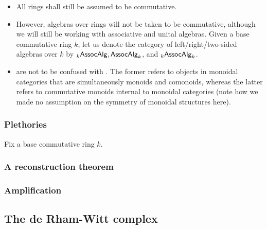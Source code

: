             \begin{convention} \label{conv: commutative_rings_noncommutative_algebras}
                \noindent
                \begin{itemize}
                    \item All rings shall still be assumed to be commutative.
                    \item However, algebras over rings will not be taken to be commutative, although we will still be working with associative and unital algebras. Given a base commutative ring $k$, let us denote the category of left/right/two-sided algebras over $k$ by ${}_k\mathsf{Assoc}\mathsf{Alg}, \mathsf{Assoc}\mathsf{Alg}_k$, and ${}_k\mathsf{Assoc}\mathsf{Alg}_k$. 
                    \item {} are not to be confused with . The former refers to objects in monoidal categories that are simultaneously monoids and comonoids, whereas the latter refers to commutative monoids internal to monoidal categories (note how we made no assumption on the symmetry of monoidal structures here). 
                \end{itemize}
            \end{convention}
            
            \subsubsection{Plethories}
                \begin{definition}[Plethories] \label{def: plethories}
                    Fix a base commutative ring $k$. 
                \end{definition}
                
            \subsubsection{A reconstruction theorem}
            
            \subsubsection{Amplification}
    
        \subsection{The de Rham-Witt complex} \label{subsection: de_rham_witt_complex}
        
